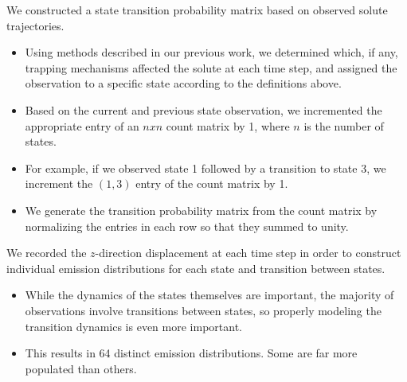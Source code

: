\documentclass{article}
\begin{document}
  
  \noindent We constructed a state transition probability matrix based on observed solute
  trajectories.
  \begin{itemize}
    \item Using methods described in our previous work, we determined 	
    which, if any, trapping mechanisms affected the solute at each time step, and
    assigned the observation to a specific state according to the definitions 
    above.~\cite{coscia_chemically_2019}
    \item Based on the current and previous state observation, we incremented the
    appropriate entry of an $n x n$ count matrix by 1, where $n$ is the number of states.
    \item For example, if we observed state 1 followed by a transition to state 3,
    we increment the $(1, 3)$ entry of the count matrix by 1.
    \item We generate the transition probability matrix from the count matrix by 
    normalizing the entries in each row so that they summed to unity.
  \end{itemize}
  
  \noindent We recorded the $z$-direction displacement at each time step in order to construct
  individual emission distributions for each state and transition between states.
  \begin{itemize}
    \item While the dynamics of the states themselves are important, the 
    majority of observations involve transitions between states, so properly modeling
    the transition dynamics is even more important.
    \item This results in 64 distinct emission distributions. Some are far more
    populated than others. %
  \end{itemize}
\end{document}
